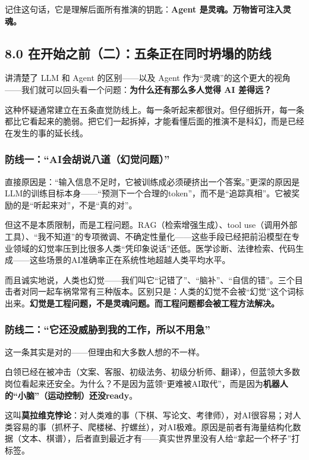 \documentclass[11pt,a4paper]{ctexart}
\begin{document}
记住这句话，它是理解后面所有推演的钥匙：\textbf{Agent 是灵魂。万物皆可注入灵魂。}

\subsection{8.0 在开始之前（二）：五条正在同时坍塌的防线}

讲清楚了 LLM 和 Agent 的区别——以及 Agent 作为“灵魂”的这个更大的视角——我们就可以回头看一个问题：\textbf{为什么还有那么多人觉得 AI 差得远？}

这种怀疑通常建立在五条直觉防线上。每一条听起来都很对。但仔细拆开，每一条都比它看起来的脆弱。把它们一起拆掉，才能看懂后面的推演不是科幻，而是已经在发生的事的延长线。

\subsubsection{防线一：“AI会胡说八道（幻觉问题）”}

直接原因是：“输入信息不足时，它被训练成必须硬挤出一个答案。”更深的原因是LLM的训练目标本身——“预测下一个合理的token”，而不是“追踪真相”。它被奖励的是“听起来对”，不是“真的对”。

但这不是本质限制，而是工程问题。RAG（检索增强生成）、tool use（调用外部工具）、“我不知道”的专项微调、不确定性量化——这些手段已经把前沿模型在专业领域的幻觉率压到比很多人类“凭印象说话”还低。医学诊断、法律检索、代码生成——这些场景的AI准确率正在系统性地超越人类平均水平。

而且诚实地说，人类也幻觉——我们叫它“记错了”、“脑补”、“自信的错”。三个目击者对同一起车祸常常有三种版本。区别只是：人类的幻觉不会被“幻觉”这个词标出来。\textbf{幻觉是工程问题，不是灵魂问题。而工程问题都会被工程方法解决。}

\subsubsection{防线二：“它还没威胁到我的工作，所以不用急”}

这一条其实是对的——但理由和大多数人想的不一样。

白领已经在被冲击（文案、客服、初级法务、初级分析师、翻译），但蓝领大多数岗位看起来还安全。为什么？不是因为蓝领“更难被AI取代”，而是因为\textbf{机器人的“小脑”（运动控制）还没ready}。

这叫\textbf{莫拉维克悖论}：对人类难的事（下棋、写论文、考律师），对AI很容易；对人类容易的事（抓杯子、爬楼梯、拧螺丝），对AI极难。原因是前者有海量结构化数据（文本、棋谱），后者直到最近才有——真实世界里没有人给“拿起一个杯子”打标签。
\end{document}
